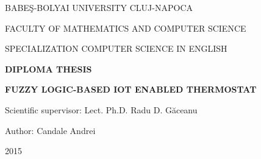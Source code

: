 \documentclass[a4paper, 12pt, english]{report}
\begin{document}
\begin{titlepage}
\sloppy
\begin{center}
\Large{BABE\c{S}-BOLYAI UNIVERSITY CLUJ-NAPOCA}

\Large{FACULTY OF MATHEMATICS AND COMPUTER SCIENCE}

\Large{SPECIALIZATION COMPUTER SCIENCE IN ENGLISH}



\vspace{7cm}
\Large \textbf{DIPLOMA THESIS}

\vspace{1.3cm}
\Huge \textbf{FUZZY LOGIC-BASED IOT ENABLED THERMOSTAT}

\end{center}
\vspace{4cm}

\begin{flushleft}
    \Large{Scientific supervisor: Lect. Ph.D. Radu D. G\u{a}ceanu}
\end{flushleft}

\vspace{1cm}

\begin{flushright}
    \Large{Author: Candale Andrei}
\end{flushright}

\vspace{1cm}

\begin{center}
\Large{2015}
\end{center}

\end{titlepage}




\tableofcontents
\listoffigures
\listoftables
















\renewcommand\bibname{Bibliography}

%
%


\end{document}

